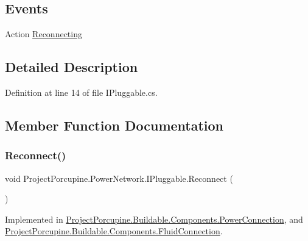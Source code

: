 \subsection*{Events}
\begin{DoxyCompactItemize}
\item 
Action \hyperlink{interface_project_porcupine_1_1_power_network_1_1_i_pluggable_a33495abbf6449fa7f0dfef592160eebd}{Reconnecting}
\end{DoxyCompactItemize}


\subsection{Detailed Description}


Definition at line 14 of file I\+Pluggable.\+cs.



\subsection{Member Function Documentation}
\mbox{\label{interface_project_porcupine_1_1_power_network_1_1_i_pluggable_aa18de95686be030b51cbf97051244e8d}} 
\subsubsection{\texorpdfstring{Reconnect()}{Reconnect()}}
{\footnotesize\ttfamily void Project\+Porcupine.\+Power\+Network.\+I\+Pluggable.\+Reconnect (\begin{DoxyParamCaption}{ }\end{DoxyParamCaption})}



Implemented in \hyperlink{class_project_porcupine_1_1_buildable_1_1_components_1_1_power_connection_af47c0e03299fbbbd9e95faf63d2a1f32}{Project\+Porcupine.\+Buildable.\+Components.\+Power\+Connection}, and \hyperlink{class_project_porcupine_1_1_buildable_1_1_components_1_1_fluid_connection_a0c7aa227db4d28fd8552631ed4cf89c5}{Project\+Porcupine.\+Buildable.\+Components.\+Fluid\+Connection}.



